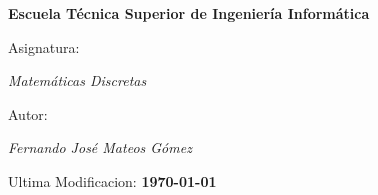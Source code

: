 \begin{titlepage}
        \centering
        {\bfseries\LARGE Escuela Técnica Superior de Ingeniería Informática \par}
        \vspace{1cm}
        {\Large Asignatura: \par \textit{Matemáticas Discretas} \par}
        \vspace{1cm}
        {\Large Autor: \par \textit{Fernando José Mateos Gómez} \par}
        \vspace{2cm}
        {\Large Ultima Modificacion: \textbf{\today} \par}
        \vspace{2cm}
\end{titlepage}
\restoregeometry